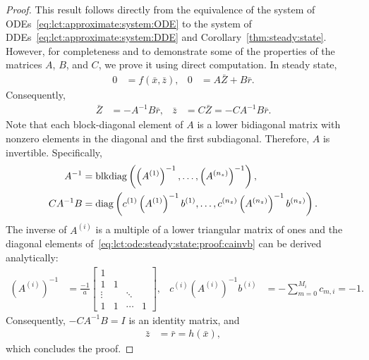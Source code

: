 \begin{proof}
	This result follows directly from the equivalence of the system of ODEs~\eqref{eq:lct:approximate:system:ODE} to the system of DDEs~\eqref{eq:lct:approximate:system:DDE} and Corollary~\ref{thm:steady:state}. However, for completeness and to demonstrate some of the properties of the matrices $A$, $B$, and $C$, we prove it using direct computation.
	In steady state,
	\begin{align}
		0 &= f(\bar x, \bar z), & 0 &= A \bar Z + B \bar r.
	\end{align}
	Consequently,
	\begin{align}
		\bar Z &= -A^{-1} B \bar r, & \bar z &= C \bar Z = -C A^{-1} B \bar r.
	\end{align}
	Note that each block-diagonal element of $A$ is a lower bidiagonal matrix with nonzero elements in the diagonal and the first subdiagonal. Therefore, $A$ is invertible. Specifically,
	\begin{subequations}\label{eq:lct:ode:steady:state:proof}
		\begin{align}
			\label{eq:lct:ode:steady:state:proof:ainv}
			A^{-1} &= \operatorname{blkdiag}\left(\left(A^{(1)}\right)^{-1}, \ldots, \left(A^{(n_z)}\right)^{-1}\right), \\
			\label{eq:lct:ode:steady:state:proof:cainvb}
			C A^{-1} B &= \operatorname{diag}\left(c^{(1)} \left(A^{(1)}\right)^{-1} b^{(1)}, \ldots, c^{(n_z)} \left(A^{(n_z)}\right)^{-1} b^{(n_z)}\right).
		\end{align}
	\end{subequations}
	The inverse of $A^{(i)}$ is a multiple of a lower triangular matrix of ones and the diagonal elements of~\eqref{eq:lct:ode:steady:state:proof:cainvb} can be derived analytically:
	\begin{align}
		\left(A^{(i)}\right)^{-1} &= \frac{-1}{a}
		\begin{bmatrix}
			1 \\
			1 & 1 \\
			\vdots & & \ddots \\
			1 & 1 & \cdots & 1
		\end{bmatrix}, &
		c^{(i)} \left(A^{(i)}\right)^{-1} b^{(i)} &= -\sum_{m=0}^{M_i} c_{m, i} = -1.
	\end{align}
	Consequently, $-C A^{-1} B = I$ is an identity matrix, and
	\begin{align}
		\bar z &= \bar r = h(\bar x),
	\end{align}
	which concludes the proof.
\end{proof}
